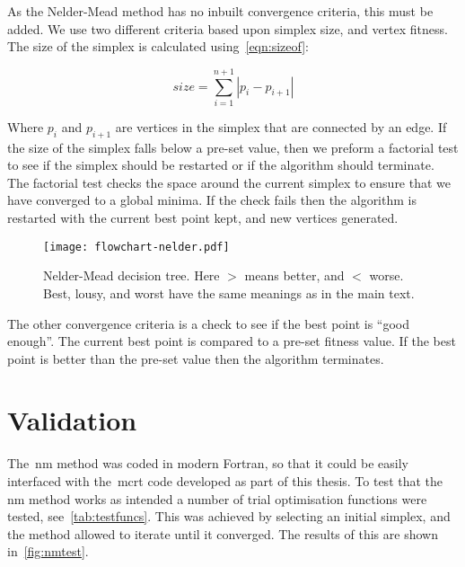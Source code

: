 As the Nelder-Mead method has no inbuilt convergence criteria, this must be added.
We use two different criteria based upon simplex size, and vertex fitness.
The size of the simplex is calculated using~\cref{eqn:sizeof}:

\begin{equation}
size=\sum\limits_{i=1}^{n+1}|p_{i}-p_{i+1}|
\label{eqn:sizeof}
\end{equation}

Where $p_i$ and $p_{i+1}$ are vertices in the simplex that are connected by an edge. 
If the size of the simplex falls below a pre-set value, then we preform a factorial test to see if the simplex should be restarted or if the algorithm should terminate.
The factorial test checks the space around the current simplex to ensure that we have converged to a global minima.
If the check fails then the algorithm is restarted with the current best point kept, and new vertices generated.

\begin{figure}[!htbp]
    \centering
    \texttt{[image: flowchart-nelder.pdf]}
    \caption{Nelder-Mead decision tree. Here $>$ means better, and $<$ worse. Best, lousy, and worst have the same meanings as in the main text.}
    \label{fig:NM-algo}
\end{figure}

The other convergence criteria is a check to see if the best point is ``good enough''.
The current best point is compared to a pre-set fitness value.
If the best point is better than the pre-set value then the algorithm terminates.

\FloatBarrier
\section{Validation}
The~\gls*{nm} method was coded in modern Fortran, so that it could be easily interfaced with the~\gls*{mcrt} code developed as part of this thesis.
To test that the \gls*{nm} method works as intended a number of trial optimisation functions were tested, see~\cref{tab:testfuncs}.
This was achieved by selecting an initial simplex, and the method allowed to iterate until it converged.
The results of this are shown in~\cref{fig:nmtest}.


